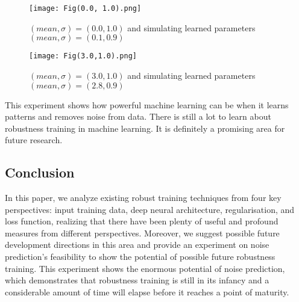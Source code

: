 \documentclass{article}
\begin{document}
\begin{figure}
\centering
\texttt{[image: Fig(0.0, 1.0).png]}
\caption{\label{figure 4:}$(mean, \sigma) = (0.0, 1.0)$ and simulating learned parameters $(mean, \sigma) = (0.1, 0.9)$}
\end{figure}

\begin{figure}
\centering
\texttt{[image: Fig(3.0,1.0).png]}
\caption{\label{figure 5:}$(mean, \sigma) = (3.0, 1.0)$ and simulating learned parameters $(mean, \sigma) = (2.8, 0.9)$}
\end{figure}
This experiment shows how powerful machine learning can be when it learns patterns and removes noise from data. There is still a lot to learn about robustness training in machine learning. It is definitely a promising area for future research.

\subsection{Conclusion}

In this paper, we analyze existing robust training techniques from four key perspectives: input training data, deep neural architecture, regularisation, and loss function, realizing that there have been plenty of useful and profound measures from different perspectives. Moreover, we suggest possible future development directions in this area and provide an experiment on noise prediction's feasibility to show the potential of possible future robustness training. This experiment shows the enormous potential of noise prediction, which demonstrates that robustness training is still in its infancy and a considerable amount of time will elapse before it reaches a point of maturity.





\end{document}
